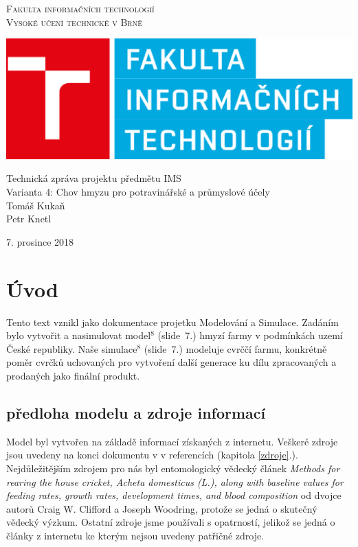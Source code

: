 \documentclass[a4paper, 12pt]{extarticle}
\begin{document}
\begin{center} 
\thispagestyle{empty}
\Huge
\textsc{Fakulta informačních technologií\\Vysoké učení
technické v Brně}\\

\includegraphics[scale = 0.5]{fit-logo.eps}


\LARGE Technická zpráva projektu předmětu IMS\\
\Huge Varianta 4: Chov hmyzu pro potravinářské a průmyslové účely \\
\Huge
Tomáš Kukaň \\
Petr Knetl \\

\end{center}
{\LARGE \hfill
7. prosince 2018}

\newpage

\tableofcontents
{}
\thispagestyle{empty}
\setcounter{page}{1}
\newpage

\section{Úvod}
Tento text vznikl jako dokumentace projetku Modelování a Simulace. Zadáním bylo vytvořit a nasimulovat model$^{8}$ (slide~7.)	 hmyzí farmy v podmínkách uzemí České republiky. Naše simulace$^{8}$ (slide~7.) modeluje cvrččí farmu, konkrétně poměr cvrčků uchovaných pro vytvoření další generace ku dílu zpracovaných a prodaných jako finální produkt.

\subsection{předloha modelu a zdroje informací}
Model byl vytvořen na základě informací získaných z internetu. Veškeré zdroje jsou uvedeny na konci dokumentu v v referencích (kapitola \ref{zdroje}.). Nejdůležitějším zdrojem pro nás byl entomologický vědecký článek \textit{Methods for rearing the house cricket, Acheta domesticus (L.), along with baseline values for feeding rates, growth rates, development times, and blood composition} od dvojce autorů Craig W. Clifford a Joseph Woodring, protože se jedná o skutečný vědecký výzkum. Ostatní zdroje jsme používali s opatrností, jelikož se jedná o články z internetu ke kterým nejsou uvedeny patřičné zdroje.
\end{document}
